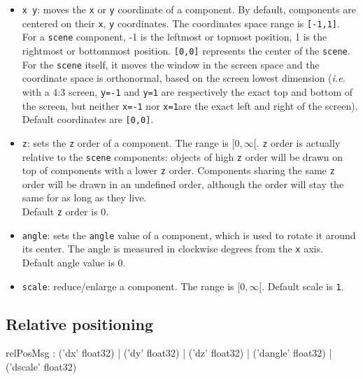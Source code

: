 \documentclass[a4paper,twoside]{report}
\newcommand{\subsublevel}[1]	{\subsection{#1}}
\newcommand{\OSC}[1]		{\texttt{#1}}
\newcommand{\values}[1]	{\texttt{#1}}
\begin{document}
\begin{itemize}
\item \OSC{x y}: moves the \values{x} or \values{y} coordinate of a component. By default, components are centered on their \values{x}, \values{y} coordinates. The coordinates space range is \values{[-1,1]}. \\
For a \OSC{scene} component, -1 is the leftmost or topmost position, 1 is the rightmost or bottommost position. \values{[0,0]} represents the center of the \OSC{scene}. \\
For the \OSC{scene} itself, it moves the window in the screen space and the coordinate space is orthonormal, based on the screen lowest dimension (\emph{i.e.} with a 4:3 screen, \OSC{y=-1} and \OSC{y=1} are respectively the exact top and bottom of the screen, but neither \OSC{x=-1} nor \OSC{x=1}are the exact left and right of the screen). \\
Default coordinates are \values{[0,0]}.
\item \OSC{z}: sets the \values{z} order of a component. The range is $[0,\infty[$. \values{z} order is actually relative to the \OSC{scene} components: objects of high \values{z} order will be drawn on top of components with a lower \values{z} order. Components sharing the same \values{z} order will be drawn in an undefined order, although the order will stay the same for as long as they live. \\
Default \values{z} order is 0.
\item \OSC{angle}: sets the \values{angle} value of a component, which is used to rotate it around its center. The angle is measured in clockwise degrees from the \values{x} axis.\\
Default angle value is 0.
\item \OSC{scale}: reduce/enlarge a component. The range is $[0,\infty[$. Default scale is \values{1}.
\end{itemize}

\subsublevel{Relative positioning}
\label{relpos}

\begin{rail}
relPosMsg :  
			('dx' float32)
		| 	('dy' float32)
		| 	('dz' float32)
		| 	('dangle' float32)
		| 	('dscale' float32) 
\end{rail}
\end{document}

